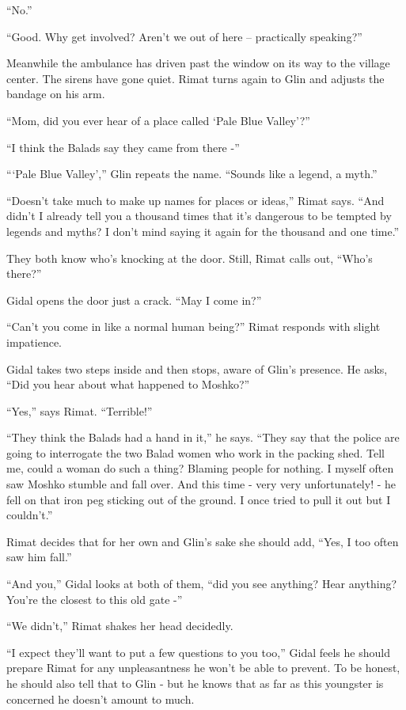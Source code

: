 \documentclass[twoside,11pt]{book}
\begin{document}
``No.''

``Good. Why get involved? Aren't we out of here -- practically speaking?''

Meanwhile the ambulance has driven past the window on its way to the village center. The sirens have gone quiet. Rimat
turns again to Glin and adjusts the bandage on his arm.

``Mom, did you ever hear of a place called `Pale Blue Valley'?''

``I think the Balads say they came from there -''

``\thinspace`Pale Blue Valley','' Glin repeats the name. ``Sounds like a legend, a
myth.''

``Doesn't take much to make up names for places or ideas,'' Rimat says. ``And
didn't I already tell you a thousand times that it's dangerous to be tempted by legends and myths? I don't mind
saying it again for the thousand and one time.''

They both know who's knocking at the door. Still, Rimat calls out, ``Who's there?''

Gidal opens the door just a crack. ``May I come in?''

``Can't you come in like a normal human being?'' Rimat responds with slight
impatience. \

Gidal takes two steps inside and then stops, aware of Glin's presence. He asks, ``Did you hear about what
happened to Moshko?''

``Yes,'' says Rimat. ``Terrible!''

``They think the Balads had a hand in it,'' he says. ``They say that the police
are going to interrogate the two Balad women who work in the packing shed. Tell me, could a woman do such a thing?
Blaming people for nothing. I myself often saw Moshko stumble and fall over. And this time - very very unfortunately! -
he fell on that iron peg sticking out of the ground. I once tried to pull it out but I couldn't.''

Rimat decides that for her own and Glin's sake she should add, ``Yes, I too often saw him
fall.''

``And you,'' Gidal looks at both of them, ``did you see anything? Hear anything?
You're the closest to this old gate -''

``We didn't,'' Rimat shakes her head decidedly.

``I expect they'll want to put a few questions to you too,'' Gidal feels he should prepare
Rimat for any unpleasantness he won't be able to prevent. To be honest, he should also tell that to Glin - but he
knows that as far as this youngster is concerned he doesn't amount to much.
\end{document}
